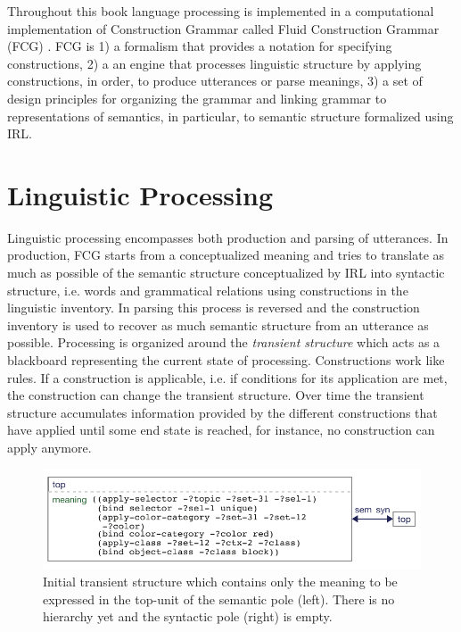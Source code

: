 Throughout this book language processing is implemented
in a computational implementation of Construction Grammar 
called Fluid Construction Grammar (FCG) . FCG is 1) a formalism
that provides a notation for specifying constructions, 2) a
an engine that processes linguistic structure by applying constructions, 
in order, to produce utterances or parse meanings, 3) a set of design principles
for organizing the grammar and linking grammar to 
representations of semantics, in particular, to semantic structure 
formalized using IRL. 

\section{Linguistic Processing}
Linguistic processing encompasses both production and parsing
of utterances. In production, FCG starts from a conceptualized
meaning and tries to translate as much as possible of
the semantic structure conceptualized by IRL into syntactic structure, 
i.e. words and grammatical relations using constructions in the linguistic inventory. 
In parsing this process is reversed and the construction inventory is used
to recover as much semantic structure from an utterance as possible.
Processing is organized around the \emph{transient structure}
which acts as a blackboard representing the current state of processing.
Constructions work like rules. If a construction is applicable,
i.e. if conditions for its application are met, the construction
can change the transient structure.
Over time the transient structure accumulates information provided by the different constructions
that have applied until some end state is reached, for instance,
no construction can apply anymore.

\begin{figure}
\begin{center}
\includegraphics[width=1.0\columnwidth]{figs/simple-grammar-initial}
\end{center}
\caption[Initial transient structure]{Initial transient structure which 
contains only the meaning 
to be expressed in the top-unit of the semantic pole (left).
There is no hierarchy yet and the syntactic pole (right) is empty.}
\label{f:initial-structure}
\end{figure}

